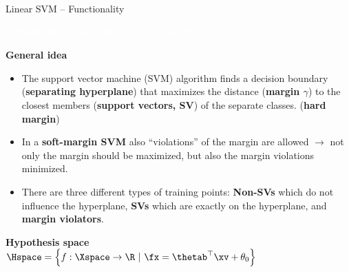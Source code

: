 \documentclass[11pt,compress,t,notes=noshow, xcolor=table]{beamer}
\newcommand{\maketag}[1]{\colorbox{highlightcol}{\textcolor{white}
{\MakeUppercase{#1}}}}
\newcommand{\highlight}[1]{\textcolor{highlightcol}{\textbf{#1}}}
\begin{document}
\begin{frame}{Linear SVM -- Functionality}

\footnotesize

\maketag{SUPERVISED}
\maketag{PARAMETRIC}
\maketag{BLACK-BOX}

\medskip

\highlight{General idea}
\begin{itemize}


  \item The support vector machine (SVM) algorithm finds a decision boundary (\textbf{separating hyperplane}) that maximizes the distance (\textbf{margin $\gamma$}) to the closest members (\textbf{support vectors, SV}) of the separate classes. (\textbf{hard margin})
  
  
  \item In a \textbf{soft-margin SVM} also \enquote{violations} of the margin are allowed $\rightarrow$ not only the margin should be maximized, but also the margin violations minimized. 
  
  
  \item There are three different types of training points: \textbf{Non-SVs} which do not influence the hyperplane, \textbf{SVs} which are exactly on the hyperplane, and \textbf{margin violators}. 
  
  
  
  


\end{itemize}

\medskip


\highlight{Hypothesis space} ~~
$\Hspace = \left\{f: \Xspace \to \R ~|~\fx = \thetab^\top \xv + \theta_0\right\}$


\end{frame}
\end{document}
